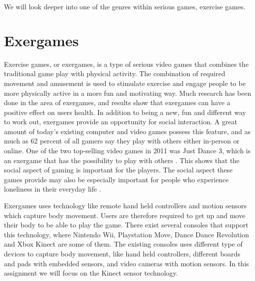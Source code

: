 We will look deeper into one of the genres within serious games, exercise games.  

\section{Exergames}
\label{sec:exergames}
Exercise games, or exergames, is a type of serious video games that combines the traditional game play with physical activity. The combination of required movement and amusement is used to stimulate exercise and engage people to be more physically active in a more fun and motivating way. Much research has been done in the area of exergames, and results show that exergames can have a positive effect on users health. In addition to being a new, fun and different way to work out, exergames provide an opportunity for social interaction. A great amount of today’s existing computer and video games possess this feature, and as much as 62 percent of all gamers say they play with others either in-person or online. One of the two top-selling video games in 2011 was Just Dance 3, which is an exergame that has the possibility to play with others \cite{statistics2012}. This shows that the social aspect of gaming is important for the players. The social aspect these games provide may also be especially important for people who experience loneliness in their everyday life \cite{project}.

Exergames uses technology like remote hand held controllers and motion sensors which capture body movement. Users are therefore required to get up and move their body to be able to play the game. There exist several consoles that support this technology, where Nintendo Wii, Playstation Move, Dance Dance Revolution and Xbox Kinect are some of them. The existing consoles uses different type of devices to capture body movement, like hand held controllers, different boards and pads with embedded sensors, and video cameras with motion sensors. In this assignment we will focus on the Kinect sensor technology. 

